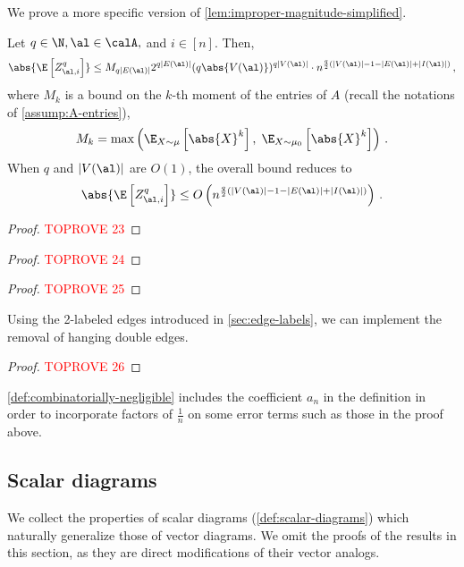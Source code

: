 \documentclass[12pt]{article}
\begin{document}
We prove a more specific version of \cref{lem:improper-magnitude-simplified}.
\begin{lemma}\label{lem:improper-magnitude}
    Let $q\in\N, \al \in \calA,$ and $i \in [n]$. Then,
    \[
        \abs{\E\left[Z_{\al,i}^q\right]} \leq M_{q|E(\al)|} 2^{q|E(\al)|}(q\abs{V(\al)})^{q|V(\al)|} \cdot n^{\frac q 2\left(|V(\al)| - 1 - |E(\al)|+|I(\al)|\right)}\,,
    \]
    where $M_{k}$ is a bound on the $k$-th moment of the entries of $A$ (recall the notations of \cref{assump:A-entries}),
    \[
        M_{k} = \max\left(\E_{X\sim \mu} \left[\abs{X}^k\right], \;
        \E_{X\sim \mu_0} \left[\abs{X}^k\right]\right) \,.
    \]
    When $q$ and $|V(\al)|$ are $O(1)$, the overall bound reduces to
    \[
        \abs{\E\left[Z_{\al,i}^q\right]} \leq O\left( n^{\frac q 2\left(|V(\al)| - 1 - |E(\al)|+|I(\al)|\right)}\right)\,.
    \]
\end{lemma}
\begin{proof}\textcolor{red}{TOPROVE 23}\end{proof}

\eqinfAlmostSure*

\begin{proof}\textcolor{red}{TOPROVE 24}\end{proof}

\eqinfProperties*
\begin{proof}\textcolor{red}{TOPROVE 25}\end{proof}


Using the 2-labeled edges introduced in \cref{sec:edge-labels}, we can
implement the removal of hanging double edges.
\removeDoubleEdge*
\begin{proof}\textcolor{red}{TOPROVE 26}\end{proof}

\cref{def:combinatorially-negligible}
includes the coefficient $a_n$ in the definition in order
to incorporate factors of $\frac 1 n$ on some error terms such as those in the proof above.
 
\subsection{Scalar diagrams}
\label{sec:scalar-diagrams}

We collect the properties of scalar diagrams (\cref{def:scalar-diagrams}) which naturally generalize those of vector diagrams.
We omit the proofs of the results in this section, as they are direct modifications of their vector analogs.
\end{document}
